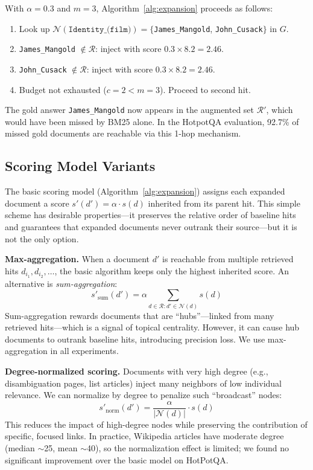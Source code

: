 \documentclass[sigconf,review]{acmart}
\begin{document}
With $\alpha = 0.3$ and $m = 3$, Algorithm~\ref{alg:expansion} proceeds as
follows:
\begin{enumerate}[leftmargin=*,nosep]
\item Look up $\mathcal{N}(\texttt{Identity\_(film)}) = \{$\texttt{James\_Mangold},
      \texttt{John\_Cusack}$\}$ in $G$.
\item \texttt{James\_Mangold} $\notin \mathcal{R}$: inject with score
      $0.3 \times 8.2 = 2.46$.
\item \texttt{John\_Cusack} $\notin \mathcal{R}$: inject with score
      $0.3 \times 8.2 = 2.46$.
\item Budget not exhausted ($c = 2 < m = 3$).  Proceed to second hit.
\end{enumerate}
The gold answer \texttt{James\_Mangold} now appears in the augmented set
$\mathcal{R}'$, which would have been missed by BM25 alone.  In the
HotpotQA evaluation, 92.7\% of missed gold documents are reachable via
this 1-hop mechanism.

\subsection{Scoring Model Variants}
\label{sec:scoring}

The basic scoring model (Algorithm~\ref{alg:expansion}) assigns each
expanded document a score $s'(d') = \alpha \cdot s(d)$ inherited from its
parent hit.  This simple scheme has desirable properties---it preserves
the relative order of baseline hits and guarantees that expanded documents
never outrank their source---but it is not the only option.

\textbf{Max-aggregation.}
When a document $d'$ is reachable from multiple retrieved hits
$d_{i_1}, d_{i_2}, \ldots$, the basic algorithm keeps only the highest
inherited score.  An alternative is \emph{sum-aggregation}:
\[
  s'_{\text{sum}}(d') = \alpha \sum_{d \in \mathcal{R}: d' \in \mathcal{N}(d)} s(d)
\]
Sum-aggregation rewards documents that are ``hubs''---linked from many
retrieved hits---which is a signal of topical centrality.  However, it
can cause hub documents to outrank baseline hits, introducing precision
loss.  We use max-aggregation in all experiments.

\textbf{Degree-normalized scoring.}
Documents with very high degree (e.g., disambiguation pages, list articles)
inject many neighbors of low individual relevance.  We can normalize by
degree to penalize such ``broadcast'' nodes:
\[
  s'_{\text{norm}}(d') = \frac{\alpha}{|\mathcal{N}(d)|} \cdot s(d)
\]
This reduces the impact of high-degree nodes while preserving the
contribution of specific, focused links.  In practice, Wikipedia
articles have moderate degree (median $\sim$25, mean $\sim$40), so
the normalization effect is limited; we found no significant improvement
over the basic model on HotPotQA.
\end{document}

